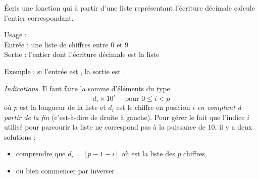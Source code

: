 \documentclass[11pt,class=report,crop=false]{standalone}
\begin{document}


\begin{activite}


\'Ecris une fonction  qui à partir d'une liste représentant l'écriture décimale calcule l'entier correspondant.
  
  \begin{fonction}
  Usage :  \\
  Entrée : une liste de chiffres entre $0$ et $9$ \\
  Sortie : l'entier dont l'écriture décimale est la liste
  
  \medskip
  Exemple : si l'entrée est \ci{[1,2,3,4]}, la sortie est .
  \end{fonction} 
  
  \emph{Indications.}  Il faut faire la somme d'éléments du type
    $$d_i \times 10^{i} \quad \text{ pour } 0 \le i < p$$
    où $p$ est la longueur de la liste et $d_i$ est le chiffre en position $i$ \emph{en comptant à partir de la fin} (c'est-à-dire de droite à gauche). Pour gérer le fait que l'indice $i$ utilisé pour parcourir la liste ne correspond pas à la puissance de $10$, il y a deux solutions :
  \begin{itemize}
    \item comprendre que $d_i = $$[p-1-i]$ où  est la liste des $p$ chiffres,
    \item ou bien commencer par inverser .    
   \end{itemize}  
  
\end{activite}

\end{document}
